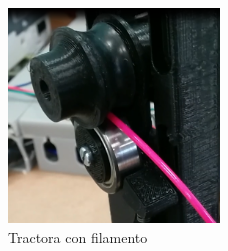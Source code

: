 	\begin{figure}[H]
            \centering
            \includegraphics[width=0.5\textwidth]{images/producciones/tractora/final.png}
            \caption{Tractora con filamento}
            \label{fig:tractora_fila}
    \end{figure}
